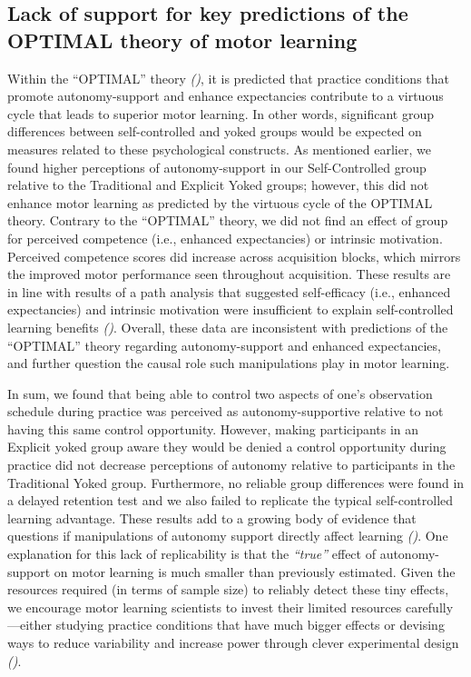 \documentclass[
  english,
  jou]{apa7}
\begin{document}
\hypertarget{lack-of-support-for-key-predictions-of-the-optimal-theory-of-motor-learning}{%
\subsection{Lack of support for key predictions of the OPTIMAL theory of motor learning}\label{lack-of-support-for-key-predictions-of-the-optimal-theory-of-motor-learning}}

Within the ``OPTIMAL'' theory \emph{()}, it is predicted that practice conditions that promote autonomy-support and enhance expectancies contribute to a virtuous cycle that leads to superior motor learning. In other words, significant group differences between self-controlled and yoked groups would be expected on measures related to these psychological constructs. As mentioned earlier, we found higher perceptions of autonomy-support in our Self-Controlled group relative to the Traditional and Explicit Yoked groups; however, this did not enhance motor learning as predicted by the virtuous cycle of the OPTIMAL theory. Contrary to the ``OPTIMAL'' theory, we did not find an effect of group for perceived competence (i.e., enhanced expectancies) or intrinsic motivation. Perceived competence scores did increase across acquisition blocks, which mirrors the improved motor performance seen throughout acquisition. These results are in line with results of a path analysis that suggested self-efficacy (i.e., enhanced expectancies) and intrinsic motivation were insufficient to explain self-controlled learning benefits \emph{()}. Overall, these data are inconsistent with predictions of the ``OPTIMAL'' theory regarding autonomy-support and enhanced expectancies, and further question the causal role such manipulations play in motor learning.

In sum, we found that being able to control two aspects of one's observation schedule during practice was perceived as autonomy-supportive relative to not having this same control opportunity. However, making participants in an Explicit yoked group aware they would be denied a control opportunity during practice did not decrease perceptions of autonomy relative to participants in the Traditional Yoked group. Furthermore, no reliable group differences were found in a delayed retention test and we also failed to replicate the typical self-controlled learning advantage. These results add to a growing body of evidence that questions if manipulations of autonomy support directly affect learning \emph{()}. One explanation for this lack of replicability is that the \emph{``true''} effect of autonomy-support on motor learning is much smaller than previously estimated. Given the resources required (in terms of sample size) to reliably detect these tiny effects, we encourage motor learning scientists to invest their limited resources carefully---either studying practice conditions that have much bigger effects or devising ways to reduce variability and increase power through clever experimental design \emph{()}.
\end{document}
